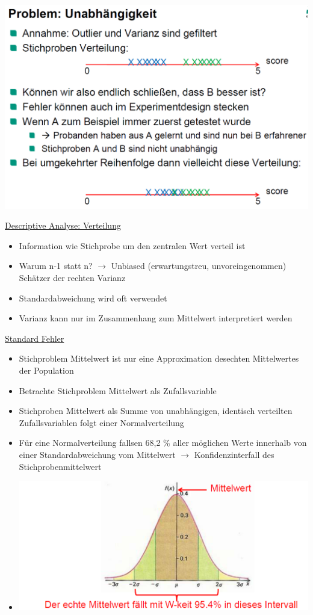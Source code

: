 \documentclass[a4paper,10pt,oneside]{article}
\begin{document}
 \includegraphics[scale=0.2]{Grafiken/2421.png}
 	
\underline{Descriptive Analyse: Verteilung} \\
	\begin{itemize}
		\item Information wie Stichprobe um den zentralen Wert verteil ist
		\item Warum n-1 statt n? $\rightarrow$ Unbiased (erwartungstreu, unvoreingenommen) Schätzer der rechten Varianz
		\item Standardabweichung wird oft verwendet
		\item Varianz kann nur im Zusammenhang zum Mittelwert interpretiert werden
	\end{itemize}
	
\underline{Standard Fehler} \\
 	\begin{itemize}
 		\item Stichproblem Mittelwert ist nur eine Approximation desechten Mittelwertes der Population
 		\item Betrachte Stichproblem Mittelwert als Zufallsvariable
 		\item Stichproben Mittelwert als Summe von unabhängigen, identisch verteilten Zufallsvariablen folgt einer Normalverteilung 
 		\item Für eine Normalverteilung fallsen 68,2 \% aller möglichen Werte innerhalb von einer Standardabweichung vom Mittelwert $\rightarrow$ Konfidenzinterfall des Stichprobenmittelwert
 		\item[] \includegraphics[scale=0.2]{Grafiken/2424.png}
 	\end{itemize}
 	
\end{document}

